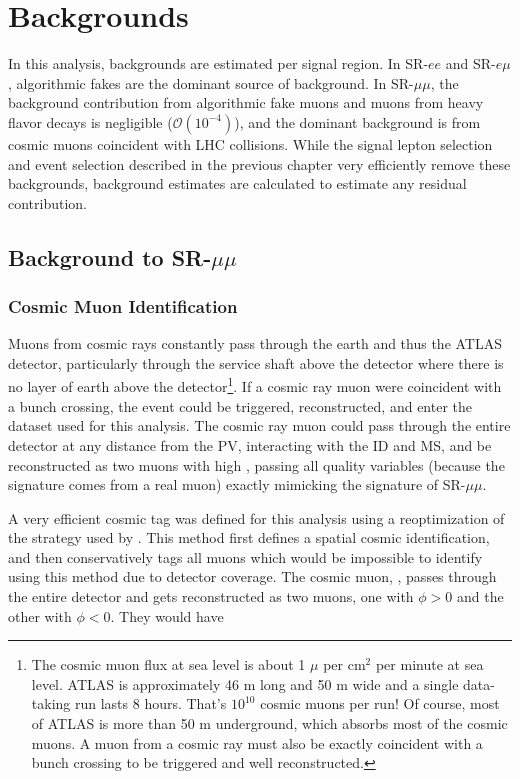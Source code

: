 \chapter{Backgrounds}
\label{chap:backgrounds}

In this analysis, backgrounds are estimated per signal region. In SR-$ee$ and SR-$e\mu$, algorithmic fakes are the dominant source of background. In SR-$\mu\mu$, the background contribution from algorithmic fake muons and muons from heavy flavor decays is negligible ($\mathcal{O}(10^{-4})$), and the dominant background is from cosmic muons coincident with \ac{LHC} collisions. While the signal lepton selection and event selection described in the previous chapter very efficiently remove these backgrounds, background estimates are calculated to estimate any residual contribution. 

\section{Background to SR-$\mu\mu$}

\subsection{Cosmic Muon Identification}
\label{sec:cosmics}
Muons from cosmic rays constantly pass through the earth and thus the \ac{ATLAS} detector, particularly through the service shaft above the detector where there is no layer of earth above the detector\footnote{The cosmic muon flux at sea level is about 1 $\mu$ per cm$^2$ per minute at sea level. ATLAS is approximately 46 m long and 50 m wide and a single data-taking run lasts 8 hours. That's $10^{10}$ cosmic muons per run! Of course, most of \ac{ATLAS} is more than 50 m underground, which absorbs most of the cosmic muons. A muon from a cosmic ray must also be exactly coincident with a bunch crossing to be triggered and well reconstructed. }. If a cosmic ray muon were coincident with a bunch crossing, the event could be triggered, reconstructed, and enter the dataset used for this analysis. The cosmic ray muon could pass through the entire detector at any distance from the \ac{PV}, interacting with the \ac{ID} and \ac{MS}, and be reconstructed as two muons with high \absdz, passing all quality variables (because the signature comes from a real muon) exactly mimicking the signature of SR-$\mu\mu$. 

A very efficient cosmic tag was defined for this analysis using a reoptimization of the strategy used by \cite{ATLAS-CONF-2019-006}.  This method first defines a spatial cosmic identification, and then conservatively tags all muons which would be impossible to identify using this method due to detector coverage. The cosmic muon, \mcos, passes through the entire detector and gets reconstructed as two muons, one with $\phi > 0$ and the other with $\phi < 0$. They would have 

